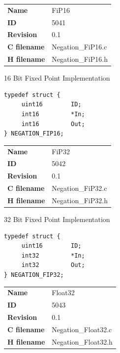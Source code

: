 \ifdefined \AddTestReports
{}
\fi
{}
\nopagebreak[0]
\begin{tabular}{l l}
\textbf{Name} & FiP16 \tabularnewline
\textbf{ID} & 5041 \tabularnewline
\textbf{Revision} & 0.1 \tabularnewline
\textbf{C filename} & Negation\_FiP16.c \tabularnewline
\textbf{H filename} & Negation\_FiP16.h \tabularnewline
\end{tabular}
\vspace{1ex}

16 Bit Fixed Point Implementation

\begin{lstlisting}
typedef struct {
     uint16        ID;
     int16         *In;
     int16         Out;
} NEGATION_FIP16;
\end{lstlisting}

\ifdefined \AddTestReports
{}
\fi
{}
\nopagebreak[0]
\begin{tabular}{l l}
\textbf{Name} & FiP32 \tabularnewline
\textbf{ID} & 5042 \tabularnewline
\textbf{Revision} & 0.1 \tabularnewline
\textbf{C filename} & Negation\_FiP32.c \tabularnewline
\textbf{H filename} & Negation\_FiP32.h \tabularnewline
\end{tabular}
\vspace{1ex}

32 Bit Fixed Point Implementation

\begin{lstlisting}
typedef struct {
     uint16        ID;
     int32         *In;
     int32         Out;
} NEGATION_FIP32;
\end{lstlisting}

\ifdefined \AddTestReports
{}
\fi
{}
\nopagebreak[0]
\begin{tabular}{l l}
\textbf{Name} & Float32 \tabularnewline
\textbf{ID} & 5043 \tabularnewline
\textbf{Revision} & 0.1 \tabularnewline
\textbf{C filename} & Negation\_Float32.c \tabularnewline
\textbf{H filename} & Negation\_Float32.h \tabularnewline
\end{tabular}
\vspace{1ex}

